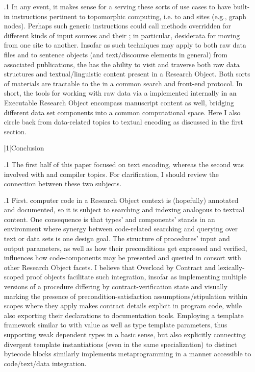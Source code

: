 \documentclass[11pt, twocolumn]{article}
\begin{document}
\p.1{%
In any event, it makes sense for a  serving these
sorts of use cases to have built-in instructions pertinent
to topomorphic computing, i.e. to  and
 sites (e.g., graph nodes). Perhaps
such generic instructions could call  methods overridden
for different kinds of input sources and their ;
in particular, desiderata for moving from one site to another.
Insofar as such techniques may apply to both raw data files
and to sentence objects (and text/discourse elements in general)
from associated publications, the  has the ability to
visit and traverse both raw data structures and textual/linguistic
content present in a Research Object. Both sorts of
materials are tractable to the  in a common search
and front-end protocol. In short, the tools for working
with raw data \mdash{} via a  implemented internally
in an Executable Research Object \mdash{} encompass
manuscript content as well, bridging different data set components
into a common computational space. Here I also circle back
from data-related topics to textual encoding as discussed in the
first section. \thispagestyle{two}
}%


\s|1|{Conclusion}

\p.1{%
The first half of this paper focused on text encoding,
whereas the second was involved with  and
compiler topics. For clarification, I should review the
connection between these two subjects.
}%

\p.1{%
First. computer code in a Research Object context
is (hopefully) annotated and documented, so it is subject
to searching and indexing analogous to textual
content. One consequence is that types' and
components'  stands in an environment
where synergy between code-related searching
and querying over text or data sets is one
design goal. The structure of procedures' input and
output parameters, as well as how their preconditions
get expressed and verified, influences how
code-components may be presented and queried
in consort with other Research Object facets.
I believe that Overload by Contract
and lexically-scoped proof objects facilitate
such integration, insofar as implementing
multiple versions of a procedure differing
by contract-verification state \mdash{} and
visually marking the presence of precondition-satisfaction
assumptions/stipulation within scopes where they apply
\mdash{} makes contract details explicit in program
code, while also exporting their declarations to
documentation tools. Employing a template
framework similar to  \mdash{} with value
as well as type template parameters, thus
supporting weak dependent types in a basic sense,
but also explicitly connecting
divergent template instantiations
(even in the same specialization) to
distinct bytecode blocks \mdash{} similarly
implements metaprogramming in a
manner accessible to code/text/data integration.
}%
\end{document}
